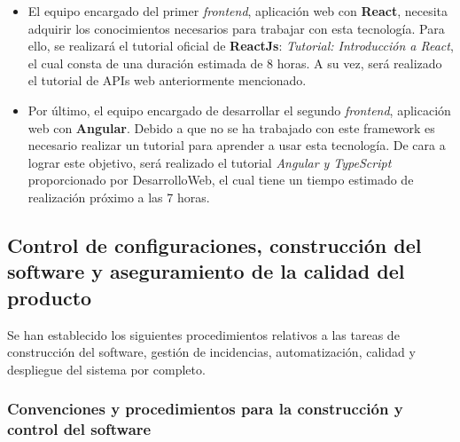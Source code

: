 \documentclass[11pt, a4paper, titlepage]{article}
\begin{document}
\begin{itemize}
\item El equipo encargado del primer \textit{frontend}, aplicación web con \textbf{React}, necesita adquirir los conocimientos necesarios para trabajar con esta tecnología. Para ello, se realizará el tutorial oficial de \textbf{ReactJs}: \textit{Tutorial: Introducción a React}\textsuperscript{\cite{reactjs}}, el cual consta de una duración estimada de 8 horas. A su vez, será realizado el tutorial de APIs web anteriormente mencionado\textsuperscript{\cite{apisweb}}.

\item Por último, el equipo encargado de desarrollar el segundo \textit{frontend}, aplicación web con \textbf{Angular}. Debido a que no se ha trabajado con este framework es necesario realizar un tutorial para aprender a usar esta tecnología. De cara a lograr este objetivo, será realizado el tutorial \textit{Angular y TypeScript}\textsuperscript{\cite{angular}} proporcionado por DesarrolloWeb, el cual tiene un tiempo estimado de realización próximo a las 7 horas.

\end{itemize}

\subsection{Control de configuraciones, construcción del software y aseguramiento de la calidad del producto}

Se han establecido los siguientes procedimientos relativos a las tareas de construcción del software, gestión de incidencias, automatización,  calidad y despliegue del sistema por completo.

\subsubsection{Convenciones y procedimientos para la construcción y control del software}
\end{document}
